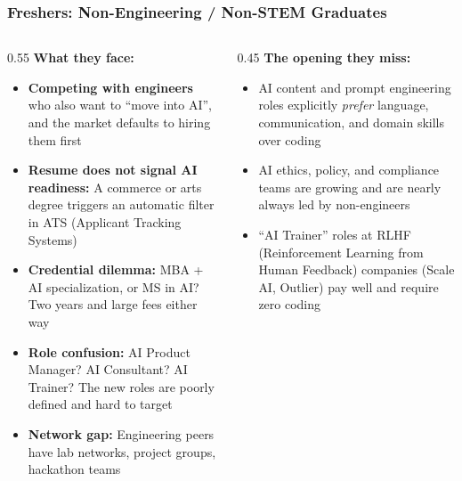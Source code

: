 \begin{frame}[fragile]\frametitle{Freshers: Non-Engineering / Non-STEM Graduates}

\begin{columns}
    \begin{column}[T]{0.55\linewidth}
\textbf{What they face:}
\begin{itemize}
\item \textbf{Competing with engineers} who also want to ``move into AI'', and the market defaults to hiring them first
\item \textbf{Resume does not signal AI readiness:} A commerce or arts degree triggers an automatic filter in ATS (Applicant Tracking Systems)
\item \textbf{Credential dilemma:} MBA + AI specialization, or MS in AI? Two years and large fees either way
\item \textbf{Role confusion:} AI Product Manager? AI Consultant? AI Trainer? The new roles are poorly defined and hard to target
\item \textbf{Network gap:} Engineering peers have lab networks, project groups, hackathon teams
\end{itemize}
    \end{column}
    \begin{column}[T]{0.45\linewidth}
\textbf{The opening they miss:}

\begin{itemize}
\item AI content and prompt engineering roles explicitly \textit{prefer} language, communication, and domain skills over coding
\item AI ethics, policy, and compliance teams are growing and are nearly always led by non-engineers
\item ``AI Trainer'' roles at RLHF (Reinforcement Learning from Human Feedback) companies (Scale AI, Outlier) pay well and require zero coding
\end{itemize}
    \end{column}
\end{columns}

\end{frame}


